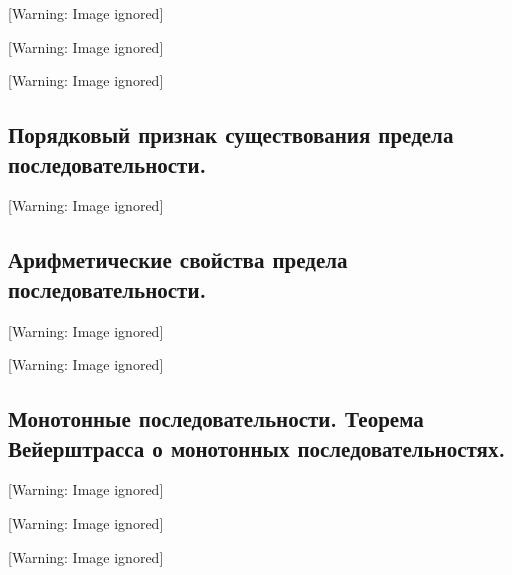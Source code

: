 \documentclass[a4paper]{article}
\begin{document}
  [Warning: Image ignored] %
 

  [Warning: Image ignored] %
 

  [Warning: Image ignored] %
 

\subsection{Порядковый признак существования предела последовательности.}
  [Warning: Image ignored] %
 

\subsection{Арифметические свойства предела последовательности.}
  [Warning: Image ignored] %
 

  [Warning: Image ignored] %
 

\subsection{Монотонные последовательности. Теорема Вейерштрасса о монотонных последовательностях.}
  [Warning: Image ignored] %
 

  [Warning: Image ignored] %
 

  [Warning: Image ignored] %
 
\end{document}
